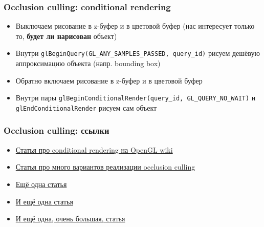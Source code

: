 \documentclass{beamer}
\begin{document}
\begin{frame}[fragile]
\frametitle{Occlusion culling: conditional rendering}
\begin{itemize}
\item Выключаем рисование в z-буфер и в цветовой буфер (нас интересует только то, \textbf{будет ли нарисован} объект)
\pause
\item Внутри \verb|glBeginQuery(GL_ANY_SAMPLES_PASSED, query_id)| рисуем дешёвую аппроксимацию объекта (напр. bounding box)
\pause
\item Обратно включаем рисование в z-буфер и в цветовой буфер
\pause
\item Внутри пары \verb|glBeginConditionalRender(query_id, GL_QUERY_NO_WAIT)| и \verb|glEndConditionalRender| рисуем сам объект
\end{itemize}
\end{frame}

\begin{frame}[fragile]
\frametitle{Occlusion culling: ссылки}
\begin{itemize}
\item \href{https://www.khronos.org/opengl/wiki/Vertex_Rendering#Conditional_rendering}{Статья про conditional rendering на OpenGL wiki}
\item \href{https://arm-software.github.io/opengl-es-sdk-for-android/occlusion_culling.html}{Статья про много вариантов реализации occlusion culling}
\item \href{https://developer.nvidia.com/gpugems/gpugems2/part-i-geometric-complexity/chapter-6-hardware-occlusion-queries-made-useful}{Ещё одна статья}
\item \href{https://interplayoflight.wordpress.com/2017/11/15/experiments-in-gpu-based-occlusion-culling}{И ещё одна статья}
\item \href{http://www.diva-portal.org/smash/get/diva2:934562/FULLTEXT02.pdf}{И ещё одна, очень большая, статья}
\end{itemize}
\end{frame}
\end{document}
